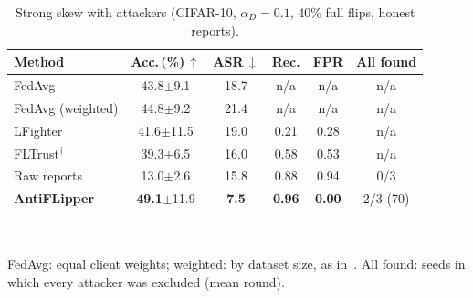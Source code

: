 \begin{table}[t]
\centering
\caption{Strong skew with attackers (CIFAR-10, $\alpha_D{=}0.1$, 40\% full flips, honest reports).}
\label{tab:skew}
\footnotesize
\setlength{\tabcolsep}{3.6pt}
\begin{tabular}{@{}l ccccc@{}}
\toprule
\textbf{Method} & Acc.\,(\%)\,$\uparrow$ & ASR\,$\downarrow$ & Rec. & FPR & All found \\
\midrule
FedAvg & 43.8{\scriptsize$\pm$9.1} & 18.7 & n/a & n/a & n/a \\
FedAvg (weighted) & 44.8{\scriptsize$\pm$9.2} & 21.4 & n/a & n/a & n/a \\
LFighter & 41.6{\scriptsize$\pm$11.5} & 19.0 & 0.21 & 0.28 & n/a \\
FLTrust$^{\dagger}$ & 39.3{\scriptsize$\pm$6.5} & 16.0 & 0.58 & 0.53 & n/a \\
\midrule
Raw reports & 13.0{\scriptsize$\pm$2.6} & 15.8 & 0.88 & 0.94 & 0/3 \\
\textbf{AntiFLipper} & \textbf{49.1}{\scriptsize$\pm$11.9} & \textbf{7.5} & \textbf{0.96} & \textbf{0.00} & 2/3 (70) \\
\bottomrule
\end{tabular}
\\[2pt]\parbox{\linewidth}{\scriptsize FedAvg: equal client weights; weighted: by dataset size, as in~\cite{fedavg-pmlr-v54-mcmahan17a}. All found: seeds in which every attacker was excluded (mean round).}
\end{table}
